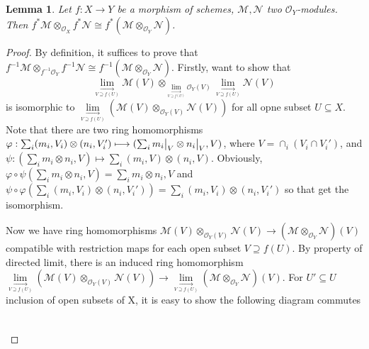 \documentclass{ctexart}
\newtheorem{lemma}{Lemma}[section]
\begin{document}
\begin{lemma}
    Let $f: X \longrightarrow Y$ be a morphism of schemes, $\mathcal{M}, \mathcal{N}$ two $\mathcal{O}_{Y}$-modules.
    Then $f^{\ast}\mathcal{M} \otimes_{\mathcal{O}_{X}} f^{\ast}\mathcal{N} \cong f^{\ast}(\mathcal{M} \otimes_{\mathcal{O}_{Y}} \mathcal{N})$.
    \label{Lemma 6.2}
\end{lemma}
\begin{proof}
    By definition, it suffices to prove that $f^{-1}\mathcal{M} \otimes_{f^{-1}\mathcal{O}_{Y}} f^{-1}\mathcal{N} \cong f^{-1}(\mathcal{M} \otimes_{\mathcal{O}_{Y}} \mathcal{N})$.
    Firstly, want to show that
    \begin{equation*}
        \underset{\underset{V \supseteq f(U)}{\longrightarrow}}{\lim} \mathcal{M}(V) \otimes_{\underset{\underset{V \supseteq f(U)}{\longrightarrow}}{\lim} \mathcal{O}_{Y}(V)} \underset{\underset{V \supseteq f(U)}{\longrightarrow}}{\lim} \mathcal{N}(V)
    \end{equation*}
    is isomorphic to $\underset{\underset{V \supseteq f(U)}{\longrightarrow}}{\lim} (\mathcal{M}(V) \otimes_{\mathcal{O}_{Y}(V)} \mathcal{N}(V))$ for all opne subset $U \subseteq X$.
    Note that there are two ring homomorphisms $\varphi: \sum_{i} (m_{i}, V_{i}) \otimes (n_{i}, V_{i}') \longmapsto (\sum_{i} m_{i}\big{|}_{V} \otimes n_{i}\big{|}_{V}, V)$, where $V = \cap_{i} (V_{i} \cap V_{i}')$,
    and $\psi: (\sum_{i} m_{i} \otimes n_{i}, V) \longmapsto \sum_{i} (m_{i}, V) \otimes (n_{i}, V)$.
    Obviously, $\varphi \circ \psi(\sum_{i} m_{i} \otimes n_{i}, V) = \sum_{i} m_{i} \otimes n_{i}, V$ and $\psi \circ \varphi(\sum_{i} (m_{i}, V_{i}) \otimes (n_{i}, V_{i}')) = \sum_{i} (m_{i}, V_{i}) \otimes (n_{i}, V_{i}')$ so that get the isomorphism.
    \par
    Now we have ring homomorphisms $\mathcal{M}(V) \otimes_{\mathcal{O}_{Y}(V)} \mathcal{N}(V) \longrightarrow (\mathcal{M} \otimes_{\mathcal{O}_{Y}} \mathcal{N})(V)$ compatible with restriction maps for each open subset $V \supseteq f(U)$.
    By property of directed limit, there is an induced ring homomorphism $\underset{\underset{V \supseteq f(U)}{\longrightarrow}}{\lim} (\mathcal{M}(V) \otimes_{\mathcal{O}_{Y}(V)} \mathcal{N}(V)) \longrightarrow \underset{\underset{V \supseteq f(U)}{\longrightarrow}}{\lim} (\mathcal{M} \otimes_{\mathcal{O}_{Y}} \mathcal{N})(V)$.
    For $U' \subseteq U$ inclusion of open subsets of X, it is easy to show the following diagram commutes
    \begin{equation*}
        \begin{tikzcd}

\end{tikzcd}
\end{equation*}
\end{proof}
\end{document}
